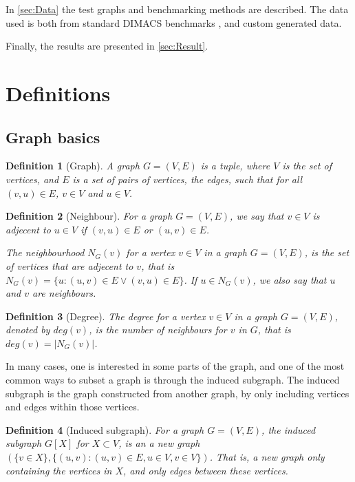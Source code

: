 \documentclass{amsart}
\newtheorem{definition}{Definition}[section]
\begin{document}
In \autoref{sec:Data} the test graphs and benchmarking methods are described. The data
used is both from standard DIMACS benchmarks \cite{DIMACS}, and custom generated data.

Finally, the results are presented in \autoref{sec:Result}.

\section{Definitions}
\label{sec:Definitions}

\subsection{Graph basics}
\label{sec:GraphBasics}

\begin{definition}[Graph]
    A graph $G = (V,E)$ is a tuple, where $V$ is the set of vertices, and $E$ is
    a set of pairs of vertices, the edges, such that for all $(v,u) \in E$,
    $v \in V$ and $u \in V$.
\end{definition}
\begin{definition}[Neighbour]
    For a graph $G = (V,E)$, we say that $v \in V$ is adjecent to 
    $u \in V$ if $(v,u) \in E$ or $(u,v) \in E$. 

    The neighbourhood $N_G(v)$ for a vertex $v \in V$ in a graph $G = (V,E)$,
    is the set of vertices that are adjecent to $v$, that is 
    $N_G(v) = \{u : (u,v) \in E \vee (v,u) \in E\}$. If $u \in N_G(v)$, we also say
    that $u$ and $v$ are neighbours.
\end{definition}

\begin{definition}[Degree]
    The degree for a vertex $v \in V$ in a graph $G = (V,E)$, denoted by 
    $deg(v)$, is the number of neighbours for $v$ in $G$, that is 
    $deg(v) = |N_G(v)|$.

\end{definition}

In many cases, one is interested in some parts of the graph, and one of the
most common ways to subset a graph is through the induced subgraph. The induced
subgraph is the graph constructed from another graph, by only including vertices
and edges within those vertices. 

\begin{definition}[Induced subgraph]
    
    For a graph $G = (V,E)$, the induced subgraph $G[X]$ for $X \subset V$, is
    an a new graph $(\{v \in X\},\{(u,v) : (u,v) \in E, u \in V,v \in V\})$. That
    is, a new graph only containing the vertices in $X$, and only edges between
    these vertices.

\end{definition}
\end{document}

